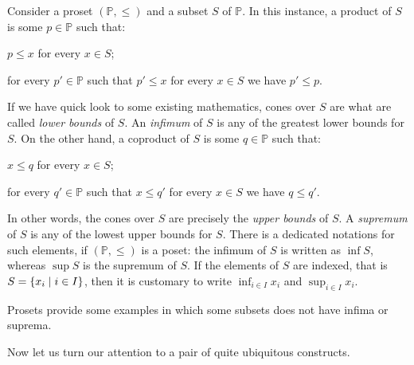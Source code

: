 \begin{example}
Consider a proset \((\mathbb P, \le)\) and a subset \(S\) of \(\mathbb P\). In this instance, a product of \(S\) is some \(p \in \mathbb P\) such that:
\begin{tcbenum}
\item \(p \le x\) for every \(x \in S\);
\item for every \(p' \in \mathbb P\) such that \(p' \le x\) for every \(x \in S\) we have \(p' \le p\). 
\end{tcbenum}
If we have  quick look to some existing mathematics, cones over \(S\) are what are called {\em lower bounds} of \(S\). An {\em infimum} of \(S\) is any of the greatest lower bounds for \(S\).\newline
On the other hand, a coproduct of \(S\) is some \(q \in \mathbb P\) such that:
\begin{tcbenum}
\item \(x \le q\) for every \(x \in S\);
\item for every \(q' \in \mathbb P\) such that \(x \le q'\) for every \(x \in S\) we have \(q \le q'\). 
\end{tcbenum}
In other words, the cones over \(S\) are precisely the {\em upper bounds} of \(S\). A {\em supremum} of \(S\) is any of the lowest upper bounds for \(S\).\newline
There is a dedicated notations for such elements, if \((\mathbb P, \le)\) is a poset: the infimum of \(S\) is written as \(\inf S\), whereas \(\sup S\) is the supremum of \(S\). If the elements of \(S\) are indexed, that is \(S = \left\{x_i \mid i \in I\right\}\), then it is customary to write \(\inf_{i \in I} x_i\) and \(\sup_{i \in I} x_i\).
\end{example}

\begin{exercise}
Prosets provide some examples in which some subsets does not have infima or suprema. 
\end{exercise}

Now let us turn our attention to a pair of quite ubiquitous constructs.

